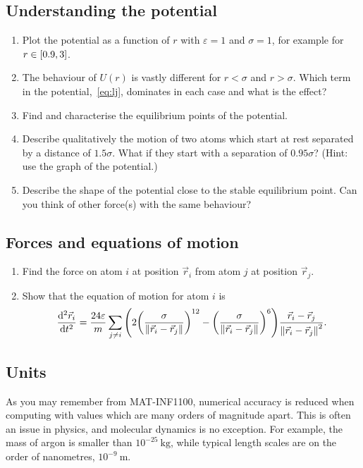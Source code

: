 \documentclass[11pt,british,a4paper]{report}
\begin{document}
\subsection{Understanding the potential}\label{subsec:understanding}
\begin{enumerate}[label=\roman*.]
    \item Plot the potential as a function of \(r\) with \(\varepsilon=1\) and \(\sigma=1\), for example for \(r \in \qty[0.9,3]\).
    \item The behaviour of \(U(r)\) is vastly different for \(r < \sigma\) and \(r > \sigma\). Which term in the potential,~\vref{eq:lj}, dominates in each case and what is the effect?
    \item Find and characterise the equilibrium points of the potential.
    \item Describe qualitatively the motion of two atoms which start at rest separated by a distance of \(\num{1.5}\sigma\). What if they start with a separation of \(\num{0.95}\sigma\)?  (Hint: use the graph of the potential.)
    \item Describe the shape of the potential close to the stable equilibrium point. Can you think of other force(s) with the same behaviour?
\end{enumerate}

\subsection{Forces and equations of motion}
\begin{enumerate}[label=\roman*.]
    \item Find the force on atom \(i\) at position \(\vec{r}_i\) from atom \(j\) at position \(\vec{r}_j\).
    \item Show that the equation of motion for atom \(i\) is
    \begin{equation}
        \dv[2]{\vec{r}_i}{t} = \frac{24\varepsilon}{m} \sum_{j \neq i} \qty(2\qty(\frac{\sigma}{\norm{\vec{r}_i-\vec{r}_j}})^{12}-\qty(\frac{\sigma}{\norm{\vec{r}_i-\vec{r}_j}})^6)\frac{\vec{r}_i-\vec{r}_j}{\norm{\vec{r}_i-\vec{r}_j}^2}.
    \end{equation}
\end{enumerate}

\subsection{Units}
As you may remember from MAT-INF1100, numerical accuracy is reduced when computing with values which are many orders of magnitude apart. This is often an issue in physics, and molecular dynamics is no exception. For example, the mass of argon is smaller than \(10^{-25}\ \si{\kg}\), while typical length scales are on the order of nanometres, \(10^{-9}\ \si{\m}\).
\end{document}
